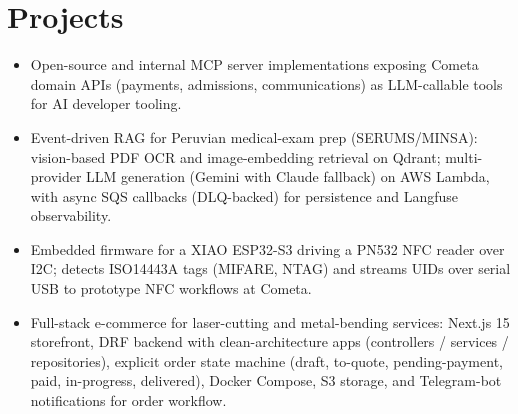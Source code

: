 \section{Projects}

\begin{itemize}
  \item Open-source and internal MCP server implementations exposing Cometa
        domain APIs (payments, admissions, communications) as LLM-callable
        tools for AI developer tooling.
\end{itemize}

\begin{itemize}
  \item Event-driven RAG for Peruvian medical-exam prep (SERUMS/MINSA): vision-based PDF OCR and image-embedding retrieval on Qdrant; multi-provider LLM generation (Gemini with Claude fallback) on AWS Lambda, with async SQS callbacks (DLQ-backed) for persistence and Langfuse observability.
\end{itemize}

\begin{itemize}
  \item Embedded firmware for a XIAO ESP32-S3 driving a PN532 NFC reader over I2C; detects ISO14443A tags (MIFARE, NTAG) and streams UIDs over serial USB to prototype NFC workflows at Cometa.
\end{itemize}

\begin{itemize}
  \item Full-stack e-commerce for laser-cutting and metal-bending services: Next.js 15 storefront, DRF backend with clean-architecture apps (controllers / services / repositories), explicit order state machine (draft, to-quote, pending-payment, paid, in-progress, delivered), Docker Compose, S3 storage, and Telegram-bot notifications for order workflow.
\end{itemize}
